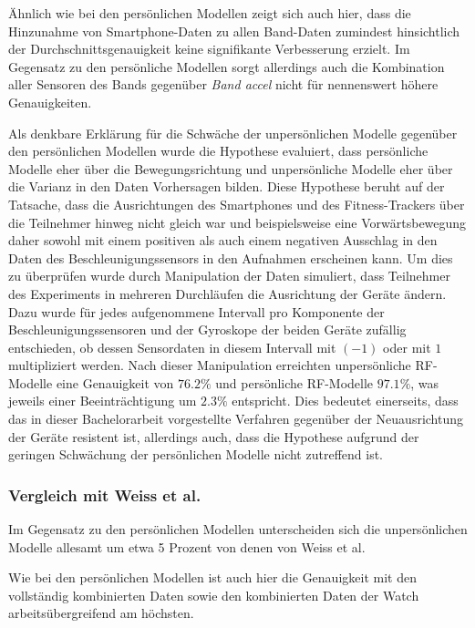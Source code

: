 Ähnlich wie bei den persönlichen Modellen zeigt sich auch hier, dass die Hinzunahme von Smartphone-Daten zu allen Band-Daten zumindest hinsichtlich der Durchschnittsgenauigkeit keine signifikante Verbesserung erzielt. Im Gegensatz zu den persönliche Modellen sorgt allerdings auch die Kombination aller Sensoren des Bands gegenüber \textit{Band accel} nicht für nennenswert höhere Genauigkeiten.

Als denkbare Erklärung für die Schwäche der unpersönlichen Modelle gegenüber den persönlichen Modellen wurde die Hypothese evaluiert, dass persönliche Modelle eher über die Bewegungsrichtung und unpersönliche Modelle eher über die Varianz in den Daten Vorhersagen bilden. Diese Hypothese beruht auf der Tatsache, dass die Ausrichtungen des Smartphones und des Fitness-Trackers über die Teilnehmer hinweg nicht gleich war und beispielsweise eine Vorwärtsbewegung daher sowohl mit einem positiven als auch einem negativen Ausschlag in den Daten des Beschleunigungssensors in den Aufnahmen erscheinen kann. Um dies zu überprüfen wurde durch Manipulation der Daten simuliert, dass Teilnehmer des Experiments in mehreren Durchläufen die Ausrichtung der Geräte ändern. Dazu wurde für jedes aufgenommene Intervall pro Komponente der Beschleunigungssensoren und der Gyroskope der beiden Geräte zufällig entschieden, ob dessen Sensordaten in diesem Intervall mit $(-1)$ oder mit $1$ multipliziert werden. Nach dieser Manipulation erreichten unpersönliche RF-Modelle eine Genauigkeit von $76.2 \%$ und persönliche RF-Modelle $97.1 \%$, was jeweils einer Beeinträchtigung um $2.3 \%$ entspricht. Dies bedeutet einerseits, dass das in dieser Bachelorarbeit vorgestellte Verfahren gegenüber der Neuausrichtung der Geräte resistent ist, allerdings auch, dass die Hypothese aufgrund der geringen Schwächung der persönlichen Modelle nicht zutreffend ist.

\subsubsection{Vergleich mit Weiss et al.}
Im Gegensatz zu den persönlichen Modellen unterscheiden sich die unpersönlichen Modelle allesamt um etwa 5 Prozent von denen von Weiss et al. 

Wie bei den persönlichen Modellen ist auch hier die Genauigkeit mit den vollständig kombinierten Daten sowie den kombinierten Daten der Watch arbeitsübergreifend am höchsten.


